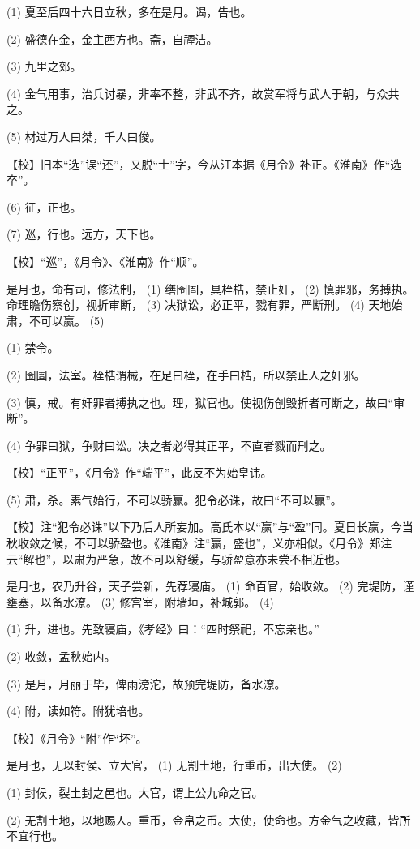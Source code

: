 \documentclass[12pt,UTF8]{ctexbook}
\begin{document}
(1) 夏至后四十六日立秋，多在是月。谒，告也。

(2) 盛德在金，金主西方也。斋，自禋洁。

(3) 九里之郊。

(4) 金气用事，治兵讨暴，非率不整，非武不齐，故赏军将与武人于朝，与众共之。

(5) 材过万人曰桀，千人曰俊。

【校】旧本“选”误“还”，又脱“士”字，今从汪本据《月令》补正。《淮南》作“选卒”。

(6) 征，正也。

(7) 巡，行也。远方，天下也。

【校】“巡”，《月令》、《淮南》作“顺”。

是月也，命有司，修法制， (1) 缮囹圄，具桎梏，禁止奸， (2) 慎罪邪，务搏执。命理瞻伤察创，视折审断， (3) 决狱讼，必正平，戮有罪，严断刑。 (4) 天地始肃，不可以赢。 (5)

(1) 禁令。

(2) 囹圄，法室。桎梏谓械，在足曰桎，在手曰梏，所以禁止人之奸邪。

(3) 慎，戒。有奸罪者搏执之也。理，狱官也。使视伤创毁折者可断之，故曰“审断”。

(4) 争罪曰狱，争财曰讼。决之者必得其正平，不直者戮而刑之。

【校】“正平”，《月令》作“端平”，此反不为始皇讳。

(5) 肃，杀。素气始行，不可以骄赢。犯令必诛，故曰“不可以赢”。

【校】注“犯令必诛”以下乃后人所妄加。高氏本以“赢”与“盈”同。夏日长赢，今当秋收敛之候，不可以骄盈也。《淮南》注“赢，盛也”，义亦相似。《月令》郑注云“解也”，以肃为严急，故不可以舒缓，与骄盈意亦未尝不相近也。

是月也，农乃升谷，天子尝新，先荐寝庙。 (1) 命百官，始收敛。 (2) 完堤防，谨壅塞，以备水潦。 (3) 修宫室，附墙垣，补城郭。 (4)

(1) 升，进也。先致寝庙，《孝经》曰：“四时祭祀，不忘亲也。”

(2) 收敛，孟秋始内。

(3) 是月，月丽于毕，俾雨滂沱，故预完堤防，备水潦。

(4) 附，读如符。附犹培也。

【校】《月令》“附”作“坏”。

是月也，无以封侯、立大官， (1) 无割土地，行重币，出大使。 (2)

(1) 封侯，裂土封之邑也。大官，谓上公九命之官。

(2) 无割土地，以地赐人。重币，金帛之币。大使，使命也。方金气之收藏，皆所不宜行也。
\end{document}
